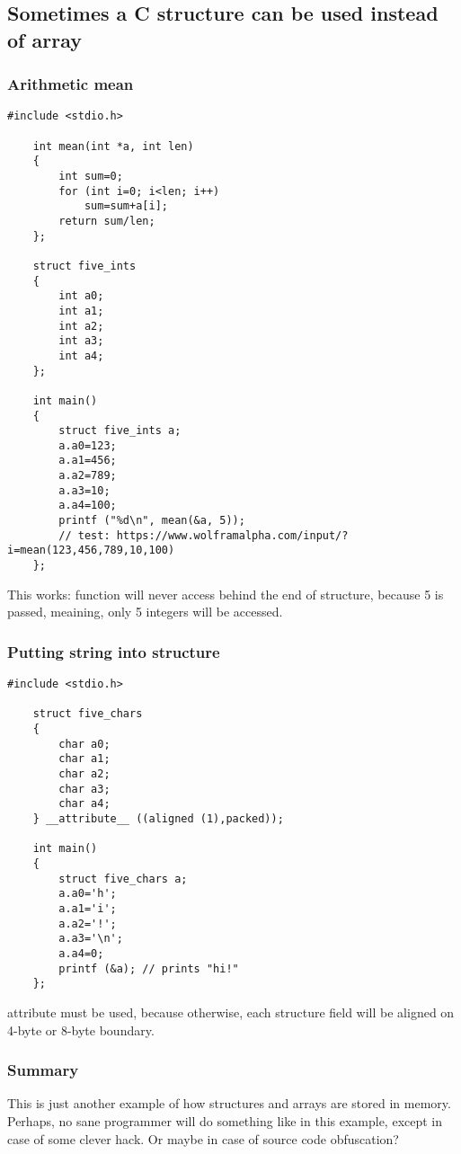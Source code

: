 \subsection{Sometimes a C structure can be used instead of array}

\subsubsection{Arithmetic mean}

\begin{lstlisting}[style=customc]
	#include <stdio.h>

	int mean(int *a, int len)
	{
		int sum=0;
		for (int i=0; i<len; i++)
			sum=sum+a[i];
		return sum/len;
	};

	struct five_ints
	{
		int a0;
		int a1;
		int a2;
		int a3;
		int a4;
	};

	int main()
	{
		struct five_ints a;
		a.a0=123;
		a.a1=456;
		a.a2=789;
		a.a3=10;
		a.a4=100;
		printf ("%d\n", mean(&a, 5));
		// test: https://www.wolframalpha.com/input/?i=mean(123,456,789,10,100)
	};
\end{lstlisting}

This works:  function will never access behind the end of  structure,
because 5 is passed, meaining, only 5 integers will be accessed.

\subsubsection{Putting string into structure}

\begin{lstlisting}[style=customc]
	#include <stdio.h>

	struct five_chars
	{
		char a0;
		char a1;
		char a2;
		char a3;
		char a4;
	} __attribute__ ((aligned (1),packed));

	int main()
	{
		struct five_chars a;
		a.a0='h';
		a.a1='i';
		a.a2='!';
		a.a3='\n';
		a.a4=0;
		printf (&a); // prints "hi!"
	};
\end{lstlisting}

 attribute must be used, because otherwise,
each structure field will be aligned on 4-byte or 8-byte boundary.

\subsubsection{Summary}

This is just another example of how structures and arrays are stored in memory.
Perhaps, no sane programmer will do something like in this example, except in case of some clever hack.
Or maybe in case of source code obfuscation?

